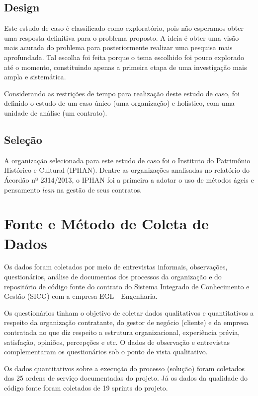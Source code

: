 \subsection[Design]{Design}

Este estudo de caso é classificado como exploratório, pois não esperamos obter uma resposta definitiva para o problema proposto. A ideia é obter uma visão mais acurada do problema para posteriormente realizar uma pesquisa mais aprofundada. Tal escolha foi feita porque o tema escolhido foi pouco explorado até o momento, constituindo apenas a primeira etapa de uma investigação mais ampla e sistemática. 

Considerando as restrições de tempo para realização deste estudo de caso, foi definido o estudo de um caso único (uma organização) e holístico, com uma unidade de análise (um contrato). 

\subsection[Seleção]{Seleção}

A organização selecionada para este estudo de caso foi o Instituto do Patrimônio Histórico e Cultural (IPHAN). Dentre as organizações analisadas no relatório do Ácordão nº 2314/2013, o IPHAN foi a primeira a adotar o uso de métodos ágeis e pensamento \textit{lean} na gestão de seus contratos. 

\section[Fonte e Método Coleta de Dados]{Fonte e Método de Coleta de Dados}

Os dados foram coletados por meio de entrevistas informais, observações, questionários, análise de documentos dos processos da organização e do repositório de código fonte do contrato do Sistema Integrado de Conhecimento e Gestão (SICG) com a empresa EGL - Engenharia.

Os questionários tinham o objetivo de coletar dados qualitativos e quantitativos a respeito da organização contratante, do gestor de negócio (cliente) e da empresa contratada no que diz respeito a estrutura organizacional, experiência prévia, satisfação, opiniões, percepções e etc. O dados de observação e entrevistas complementaram os questionários sob o ponto de vista qualitativo.

Os dados quantitativos sobre a execução do processo (solução) foram coletados das 25 ordens de serviço documentadas do projeto. Já os dados da qualidade do código fonte foram coletados de 19 sprints do projeto.

